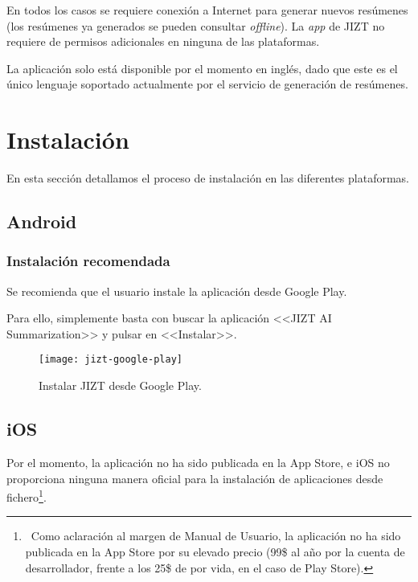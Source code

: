 En todos los casos se requiere conexión a Internet para generar nuevos resúmenes (los resúmenes ya generados se pueden consultar \emph{offline}). La \emph{app} de JIZT no requiere de permisos adicionales en ninguna de las plataformas.

La aplicación solo está disponible por el momento en inglés, dado que este es el único lenguaje soportado actualmente por el servicio de generación de resúmenes.

\vspace{2cm}

\section{Instalación}

En esta sección detallamos el proceso de instalación en las diferentes plataformas.

\subsection{Android}

\subsubsection{Instalación recomendada}

Se recomienda que el usuario instale la aplicación desde Google Play.

Para ello, simplemente basta con buscar la aplicación <<JIZT AI Summarization>> y pulsar en <<Instalar>>.

\newpage

\begin{figure}[H]
	\centering
	\texttt{[image: jizt-google-play]}
	\caption{Instalar JIZT desde Google Play.}
\end{figure}

\subsection{iOS}

Por el momento, la aplicación no ha sido publicada en la App Store, e iOS no proporciona ninguna manera oficial para la instalación de aplicaciones desde fichero\footnote{\, Como aclaración al margen de Manual de Usuario, la aplicación no ha sido publicada en la App Store por su elevado precio (99\$ al año por la cuenta de desarrollador, frente a los 25\$ de por vida, en el caso de Play Store).}.

